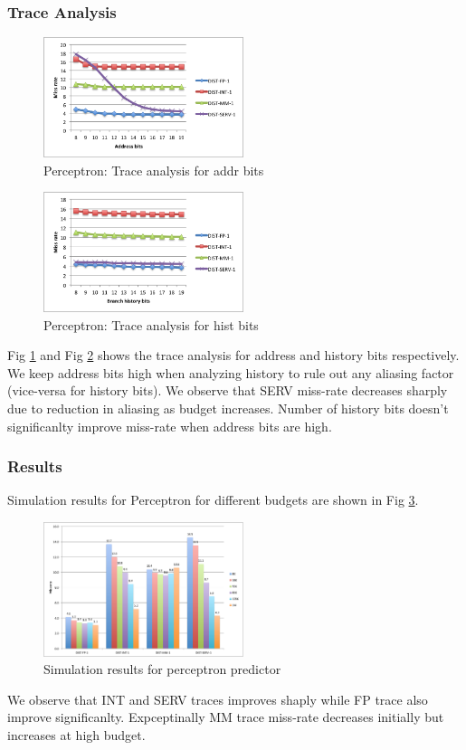 \documentclass[conference]{IEEEtran}
\begin{document}
\subsubsection{Trace Analysis}
\begin{figure}[!t]
    \centering
    \includegraphics[width=2.3in]{analysis_perceptron_addr.png}
    \caption{Perceptron: Trace analysis for addr bits}
    \label{ana_pep_addr}
\end{figure}
\begin{figure}[!t]
    \centering
    \includegraphics[width=2.3in]{analysis_perceptron_hist.png}
    \caption{Perceptron: Trace analysis for hist bits}
    \label{ana_pep_hist}
\end{figure}
Fig \ref{ana_pep_addr} and Fig \ref{ana_pep_hist} shows the trace analysis for address and history bits respectively. We keep address bits high when analyzing history to rule out any aliasing factor (vice-versa for history bits). We observe that SERV miss-rate decreases sharply due to reduction in aliasing as budget increases. Number of history bits doesn't significanlty improve miss-rate when address bits are high.
\subsubsection{Results}
Simulation results for Perceptron for different budgets are shown in Fig \ref{results_perceptron}.
\begin{figure}[!t]
    \centering
    \includegraphics[width=2.3in]{neural}
    \caption{Simulation results for perceptron predictor}
    \label{results_perceptron}
\end{figure}
We observe that INT and SERV traces improves shaply while FP trace also improve significanlty. Expceptinally MM trace miss-rate decreases initially but increases at high budget.
\end{document}
